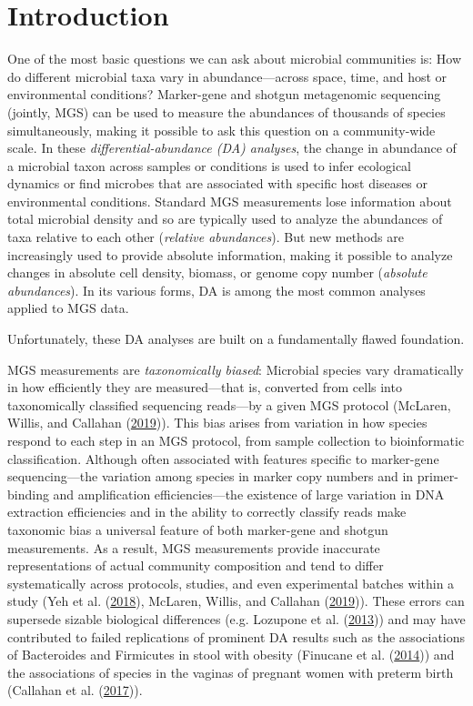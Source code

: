 \documentclass[
]{article}
\begin{document}
\hypertarget{introduction}{%
\section{Introduction}\label{introduction}}

One of the most basic questions we can ask about microbial communities is: How do different microbial taxa vary in abundance---across space, time, and host or environmental conditions?
Marker-gene and shotgun metagenomic sequencing (jointly, MGS) can be used to measure the abundances of thousands of species simultaneously, making it possible to ask this question on a community-wide scale.
In these \emph{differential-abundance (DA) analyses}, the change in abundance of a microbial taxon across samples or conditions is used to infer ecological dynamics or find microbes that are associated with specific host diseases or environmental conditions.
Standard MGS measurements lose information about total microbial density and so are typically used to analyze the abundances of taxa relative to each other (\emph{relative abundances}).
But new methods are increasingly used to provide absolute information, making it possible to analyze changes in absolute cell density, biomass, or genome copy number (\emph{absolute abundances}).
In its various forms, DA is among the most common analyses applied to MGS data.

Unfortunately, these DA analyses are built on a fundamentally flawed foundation.

MGS measurements are \emph{taxonomically biased}: Microbial species vary dramatically in how efficiently they are measured---that is, converted from cells into taxonomically classified sequencing reads---by a given MGS protocol (McLaren, Willis, and Callahan (\protect\hyperlink{ref-mclaren2019cons}{2019})).
This bias arises from variation in how species respond to each step in an MGS protocol, from sample collection to bioinformatic classification.
Although often associated with features specific to marker-gene sequencing---the variation among species in marker copy numbers and in primer-binding and amplification efficiencies---the existence of large variation in DNA extraction efficiencies and in the ability to correctly classify reads make taxonomic bias a universal feature of both marker-gene and shotgun measurements.
As a result, MGS measurements provide inaccurate representations of actual community composition and tend to differ systematically across protocols, studies, and even experimental batches within a study (Yeh et al. (\protect\hyperlink{ref-yeh2018taxo}{2018}), McLaren, Willis, and Callahan (\protect\hyperlink{ref-mclaren2019cons}{2019})).
These errors can supersede sizable biological differences (e.g. Lozupone et al. (\protect\hyperlink{ref-lozupone2013meta}{2013})) and may have contributed to failed replications of prominent DA results such as the associations of Bacteroides and Firmicutes in stool with obesity (Finucane et al. (\protect\hyperlink{ref-finucane2014atax}{2014})) and the associations of species in the vaginas of pregnant women with preterm birth (Callahan et al. (\protect\hyperlink{ref-callahan2017repl}{2017})).
\end{document}
